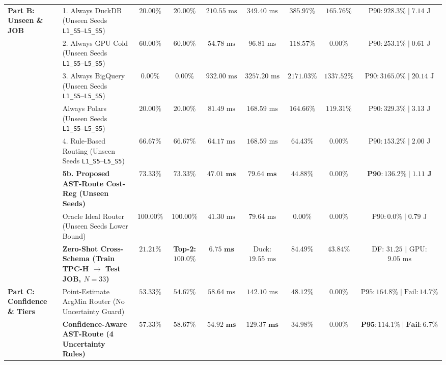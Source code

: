 \documentclass[10pt,a4paper]{article}
\begin{document}
\begin{table}[!t]
{\begin{tabular}{@{}llccccccc@{}}
\midrule
\multirow{8}{*}{\textbf{Part B: Unseen \& JOB}}
 & 1. Always DuckDB (Unseen Seeds \texttt{L1\_S5}--\texttt{L5\_S5}) & $20.00\%$ & $20.00\%$ & $210.55\text{ ms}$ & $349.40\text{ ms}$ & $385.97\%$ & $165.76\%$ & $\text{P90}: 928.3\% \mid 7.14\text{ J}$ \\
 & 2. Always GPU Cold (Unseen Seeds \texttt{L1\_S5}--\texttt{L5\_S5}) & $60.00\%$ & $60.00\%$ & $54.78\text{ ms}$ & $96.81\text{ ms}$ & $118.57\%$ & $0.00\%$ & $\text{P90}: 253.1\% \mid 0.61\text{ J}$ \\
 & 3. Always BigQuery (Unseen Seeds \texttt{L1\_S5}--\texttt{L5\_S5}) & $0.00\%$ & $0.00\%$ & $932.00\text{ ms}$ & $3257.20\text{ ms}$ & $2171.03\%$ & $1337.52\%$ & $\text{P90}: 3165.0\% \mid 20.14\text{ J}$ \\
 & Always Polars (Unseen Seeds \texttt{L1\_S5}--\texttt{L5\_S5}) & $20.00\%$ & $20.00\%$ & $81.49\text{ ms}$ & $168.59\text{ ms}$ & $164.66\%$ & $119.31\%$ & $\text{P90}: 329.3\% \mid 3.13\text{ J}$ \\
 & 4. Rule-Based Routing (Unseen Seeds \texttt{L1\_S5}--\texttt{L5\_S5}) & $66.67\%$ & $66.67\%$ & $64.17\text{ ms}$ & $168.59\text{ ms}$ & $64.43\%$ & $0.00\%$ & $\text{P90}: 153.2\% \mid 2.00\text{ J}$ \\
 & \textbf{5b. Proposed AST-Route Cost-Reg (Unseen Seeds)} & $\mathbf{73.33\%}$ & $\mathbf{73.33\%}$ & $\mathbf{47.01\text{ ms}}$ & $\mathbf{79.64\text{ ms}}$ & $\mathbf{44.88\%}$ & $\mathbf{0.00\%}$ & $\mathbf{\text{P90}: 136.2\% \mid 1.11\text{ J}}$ \\
 & Oracle Ideal Router (Unseen Seeds Lower Bound) & $100.00\%$ & $100.00\%$ & $41.30\text{ ms}$ & $79.64\text{ ms}$ & $0.00\%$ & $0.00\%$ & $\text{P90}: 0.0\% \mid 0.79\text{ J}$ \\
 & \textbf{Zero-Shot Cross-Schema (Train TPC-H $\rightarrow$ Test JOB, $N=33$)} & $21.21\%$ & \textbf{Top-2: }$\mathbf{100.0\%}$ & $\mathbf{6.75\text{ ms}}$ & Duck: $19.55\text{ ms}$ & $84.49\%$ & $43.84\%$ & DF: $31.25$ $|$ GPU: $9.05\text{ ms}$ \\
\midrule
\multirow{5}{*}{\textbf{Part C: Confidence \& Tiers}}
 & Point-Estimate ArgMin Router (No Uncertainty Guard) & $53.33\%$ & $54.67\%$ & $58.64\text{ ms}$ & $142.10\text{ ms}$ & $48.12\%$ & $0.00\%$ & $\text{P95}: 164.8\% \mid \text{Fail}: 14.7\%$ \\
 & \textbf{Confidence-Aware AST-Route (4 Uncertainty Rules)} & $\mathbf{57.33\%}$ & $\mathbf{58.67\%}$ & $\mathbf{54.92\text{ ms}}$ & $\mathbf{129.37\text{ ms}}$ & $\mathbf{34.98\%}$ & $\mathbf{0.00\%}$ & $\mathbf{\text{P95}: 114.1\% \mid \text{Fail}: 6.7\%}$ \\

\end{tabular}}
\end{table}
\end{document}
